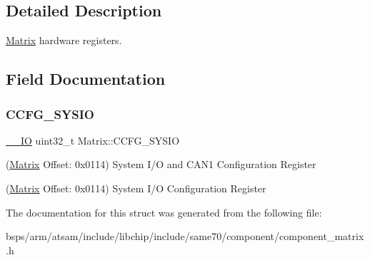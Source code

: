 \subsection{Detailed Description}
\mbox{\hyperlink{structMatrix}{Matrix}} hardware registers. 

\subsection{Field Documentation}
\mbox{\label{structMatrix_a3a8e2989ab1cad756bed54dd6b6345a8}} 
\subsubsection{\texorpdfstring{CCFG\_SYSIO}{CCFG\_SYSIO}}
{\footnotesize\ttfamily \mbox{\hyperlink{core__cm7_8h_aec43007d9998a0a0e01faede4133d6be}{\+\_\+\+\_\+\+IO}} uint32\+\_\+t Matrix\+::\+C\+C\+F\+G\+\_\+\+S\+Y\+S\+IO}



(\mbox{\hyperlink{structMatrix}{Matrix}} Offset\+: 0x0114) System I/O and C\+A\+N1 Configuration Register 

(\mbox{\hyperlink{structMatrix}{Matrix}} Offset\+: 0x0114) System I/O Configuration Register 

The documentation for this struct was generated from the following file\+:\begin{DoxyCompactItemize}
\item 
bsps/arm/atsam/include/libchip/include/same70/component/component\+\_\+matrix.\+h\end{DoxyCompactItemize}
